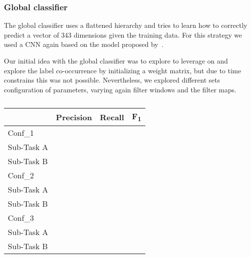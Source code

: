\documentclass[11pt,a4paper]{article}
\begin{document}
\subsubsection{Global classifier}


The global classifier uses a flattened hierarchy and tries to learn how to correctly
predict a vector of 343 dimensions given the training data. For this strategy we
used a CNN again based on the model proposed by~\cite{kim-2014-convolutional}.

Our initial idea with the global classifier was to explore to leverage on and
explore the label co-occurrence by initializing a weight matrix, but due to
time constrains this was not possible. Nevertheless, we explored different sets
configuration of parameters, varying again filter windows and the filter maps.


\begin{table}[!h]
\begin{center}
\begin{tabular}{|l|r|r|r|}
\hline\centering\textbf{}  & \textbf{Precision} &  \textbf{Recall} &  \textbf{F\textsubscript{1}}\\
\hline
Conf\_1 & & & \\
\hline
 Sub-Task A   &   &  &  \\
 Sub-Task B   &   &  &  \\
\hline
\hline
Conf\_2 & & & \\
\hline
 Sub-Task A   &   &  &  \\
 Sub-Task B   &   &  &  \\
\hline
\hline
Conf\_3 & & & \\
\hline
 Sub-Task A   &   &  &  \\
 Sub-Task B   &   &  &  \\
\hline
\hline
\end{tabular}
\end{center}
\caption{\label{}}
\end{table}



\begin{comment}
low	TRUE
simple	TRUE
stopwords	TRUE

[[256, 10], [256, 7], [256, 5], [256, 3], [256, 2], [256, 1]]
kernel_initializer=random_uniform
de-wiki-fasttext-300d-1M
dropout_p = 0.5
fully_connected_layers=2
adam
batch_size=128,
shuffle=True,
validation_split=0.4,
verbose=1,
epochs=250
filtered = np.array(len(labels2idx) * [0.4])


subtask_a			subtask_b
Precision	0.8389		Precision	0.6733
Recall	0.7659		Recall	0.5032
F1	0.8008		F1	0.576
\end{comment}
\end{document}
